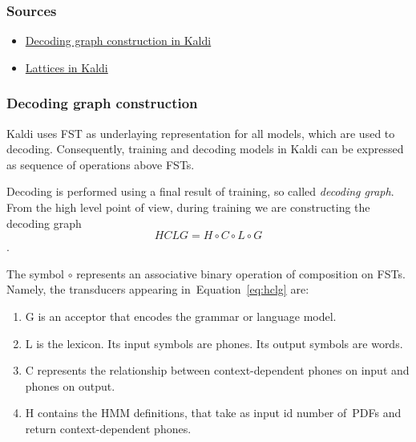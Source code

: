 \subsubsection*{Sources} %

\begin{itemize}
    \item \href{http://kaldi.sourceforge.net/graph.html} {Decoding graph construction in Kaldi}
    \item \href{http://kaldi.sourceforge.net/lattices.html} {Lattices in Kaldi}
\end{itemize}

\subsubsection*{Decoding graph construction} %
Kaldi uses \ac{FST} as underlaying representation for all models, which are used to decoding. Consequently, training and decoding models in Kaldi can be expressed as sequence of operations above \acp{FST}.

Decoding is performed using a final result of training, so called {\it decoding graph}. 
From the high level point of view,
during training we are constructing the decoding graph 
\begin{equation} \label{eq:hclg}
HCLG = H\circ C\circ L\circ G
\end{equation}.

The symbol $\circ$ represents an associative binary operation of composition on \acp{FST}.
Namely, the transducers appearing in~Equation~\ref{eq:hclg} are:
\begin{enumerate}
    \item G is an acceptor that encodes the grammar or language model.
    \item L is the lexicon. Its input symbols are phones. Its output symbols are words.
    \item C represents the relationship between context-dependent phones on input and phones on output.
    \item H contains the \ac{HMM} definitions, that take as input id number of~\acp{PDF} and return context-dependent phones.
\end{enumerate}

